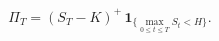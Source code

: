 \documentclass{equation-sheet}
\begin{document}
\begin{equation*}
\Pi_T=(S_T-K)^{+}\,
\mathbf{1}_{\{\max_{0\leq t\leq T}S_t<H\}}.
\end{equation*}
\end{document}
